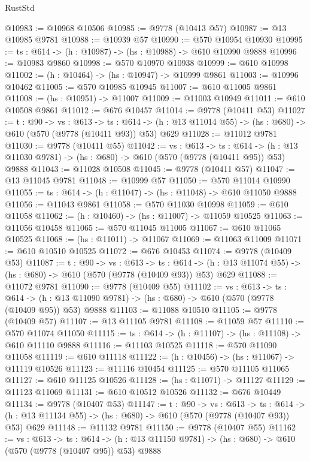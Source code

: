 \begin{lexlean}{RustStd}
\begin{coremodule}
@10983 := @10968 @10506
@10985 := @9778 (@10413 @57)
@10987 := @13 @10985 @9781
@10988 := @10939 @57
@10990 := @570 @10954 @10930
@10995 := {ts : @614} -> (h : @10987) -> (hs : @10988) -> @610 @10990 @9888
@10996 := @10983 @9860
@10998 := @570 @10970 @10938
@10999 := @610 @10998
@11002 := (h : @10464) -> (hs : @10947) -> @10999 @9861
@11003 := @10996 @10462
@11005 := @570 @10985 @10945
@11007 := @610 @11005 @9861
@11008 := (hs : @10951) -> @11007
@11009 := @11003 @10949
@11011 := @610 @10508 @9861
@11012 := @676 @10457
@11014 := @9778 (@10411 @53)
@11027 := {t : @90} ->
  {vs : @613} ->
  {ts : @614} -> (h : @13 @11014 @55) -> (hs : @680) -> @610 (@570 (@9778 (@10411 @93)) @53) @629
@11028 := @11012 @9781
@11030 := @9778 (@10411 @55)
@11042 := {vs : @613} ->
  {ts : @614} -> (h : @13 @11030 @9781) -> (hs : @680) -> @610 (@570 (@9778 (@10411 @95)) @53) @9888
@11043 := @11028 @10508
@11045 := @9778 (@10411 @57)
@11047 := @13 @11045 @9781
@11048 := @10999 @57
@11050 := @570 @11014 @10990
@11055 := {ts : @614} -> (h : @11047) -> (hs : @11048) -> @610 @11050 @9888
@11056 := @11043 @9861
@11058 := @570 @11030 @10998
@11059 := @610 @11058
@11062 := (h : @10460) -> (hs : @11007) -> @11059 @10525
@11063 := @11056 @10458
@11065 := @570 @11045 @11005
@11067 := @610 @11065 @10525
@11068 := (hs : @11011) -> @11067
@11069 := @11063 @11009
@11071 := @610 @10510 @10525
@11072 := @676 @10453
@11074 := @9778 (@10409 @53)
@11087 := {t : @90} ->
  {vs : @613} ->
  {ts : @614} -> (h : @13 @11074 @55) -> (hs : @680) -> @610 (@570 (@9778 (@10409 @93)) @53) @629
@11088 := @11072 @9781
@11090 := @9778 (@10409 @55)
@11102 := {vs : @613} ->
  {ts : @614} -> (h : @13 @11090 @9781) -> (hs : @680) -> @610 (@570 (@9778 (@10409 @95)) @53) @9888
@11103 := @11088 @10510
@11105 := @9778 (@10409 @57)
@11107 := @13 @11105 @9781
@11108 := @11059 @57
@11110 := @570 @11074 @11050
@11115 := {ts : @614} -> (h : @11107) -> (hs : @11108) -> @610 @11110 @9888
@11116 := @11103 @10525
@11118 := @570 @11090 @11058
@11119 := @610 @11118
@11122 := (h : @10456) -> (hs : @11067) -> @11119 @10526
@11123 := @11116 @10454
@11125 := @570 @11105 @11065
@11127 := @610 @11125 @10526
@11128 := (hs : @11071) -> @11127
@11129 := @11123 @11069
@11131 := @610 @10512 @10526
@11132 := @676 @10449
@11134 := @9778 (@10407 @53)
@11147 := {t : @90} ->
  {vs : @613} ->
  {ts : @614} -> (h : @13 @11134 @55) -> (hs : @680) -> @610 (@570 (@9778 (@10407 @93)) @53) @629
@11148 := @11132 @9781
@11150 := @9778 (@10407 @55)
@11162 := {vs : @613} ->
  {ts : @614} -> (h : @13 @11150 @9781) -> (hs : @680) -> @610 (@570 (@9778 (@10407 @95)) @53) @9888

\end{coremodule}
\end{lexlean}
